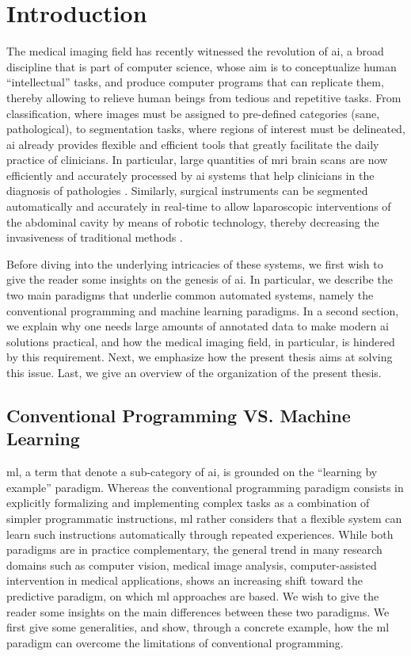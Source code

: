 \glsresetall

\chapter{Introduction}
\label{intro}

The medical imaging field has recently witnessed the revolution of \gls{ai}, a broad discipline that is part of computer science, whose aim is to conceptualize human ``intellectual'' tasks, and produce computer programs that can replicate them, thereby allowing to relieve human beings from tedious and repetitive tasks.
From classification, where images must be assigned to pre-defined categories (sane, pathological), to segmentation tasks, where regions of interest must be delineated, \gls{ai} already provides flexible and efficient tools that greatly facilitate the daily practice of clinicians.
In particular, large quantities of \gls{mri} brain scans are now efficiently and accurately processed by \gls{ai} systems that help clinicians in the diagnosis of pathologies \cite{sun19}.
Similarly, surgical instruments can be segmented automatically and accurately in real-time to allow laparoscopic interventions of the abdominal cavity by means of robotic technology, thereby decreasing the invasiveness of traditional methods \cite{davinci}.

Before diving into the underlying intricacies of these systems, we
first wish to give the reader some insights on the genesis of \gls{ai}.
In particular, we describe the two main paradigms that underlie common automated systems, namely the conventional programming and machine learning paradigms.
In a second section, we explain why one needs large amounts of annotated data to make modern \gls{ai} solutions practical, and how the medical imaging field, in particular, is hindered by this requirement.
Next, we emphasize how the present thesis aims at solving this issue.
Last, we give an overview of the organization of the present thesis.

\section{Conventional Programming VS. Machine Learning}
\Gls{ml}, a term that denote a sub-category of \gls{ai}, is grounded on the ``learning by example'' paradigm.
Whereas the conventional programming paradigm consists in explicitly formalizing and implementing complex tasks as a combination of simpler programmatic instructions,
\gls{ml} rather considers that a flexible system can learn such instructions automatically through repeated experiences.
While both paradigms are in practice complementary, the general trend in many research domains such as computer vision, medical image analysis, computer-assisted intervention in medical applications, shows an increasing shift toward the predictive paradigm, on which \gls{ml} approaches are based.
We wish to give the reader some insights on the main differences between these two paradigms.
We first give some generalities, and show, through a concrete example, how the \gls{ml} paradigm can overcome the limitations of conventional programming.

